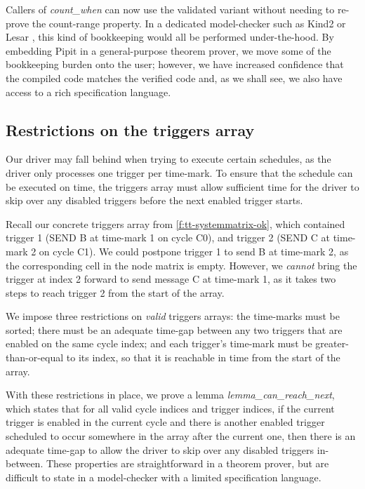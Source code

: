 \documentclass[a4paper,UKenglish,cleveref, autoref, thm-restate,anonymous]{lipics-v2021}
\begin{document}
Callers of \emph{count_when} can now use the validated variant without needing to re-prove the count-range property.
In a dedicated model-checker such as Kind2 \cite{champion2016kind2} or Lesar \cite{raymond2008synchronous}, this kind of bookkeeping would all be performed under-the-hood.
By embedding Pipit in a general-purpose theorem prover, we move some of the bookkeeping burden onto the user; however, we have increased confidence that the compiled code matches the verified code and, as we shall see, we also have access to a rich specification language.


\subsection{Restrictions on the triggers array}

Our driver may fall behind when trying to execute certain schedules, as the driver only processes one trigger per time-mark.
To ensure that the schedule can be executed on time, the triggers array must allow sufficient time for the driver to skip over any disabled triggers before the next enabled trigger starts.

Recall our concrete triggers array from \autoref{f:tt-systemmatrix-ok}, which contained trigger 1 (SEND B at time-mark 1 on cycle C0), and trigger 2 (SEND C at time-mark 2 on cycle C1).
We could postpone trigger 1 to send B at time-mark 2, as the corresponding cell in the node matrix is empty.
However, we \emph{cannot} bring the trigger at index 2 forward to send message C at time-mark 1, as it takes two steps to reach trigger 2 from the start of the array.

We impose three restrictions on \emph{valid} triggers arrays: the time-marks must be sorted; there must be an adequate time-gap between any two triggers that are enabled on the same cycle index; and each trigger's time-mark must be greater-than-or-equal to its index, so that it is reachable in time from the start of the array.

With these restrictions in place, we prove a lemma \emph{lemma_can_reach_next}, which states that for all valid cycle indices and trigger indices, if the current trigger is enabled in the current cycle and there is another enabled trigger scheduled to occur somewhere in the array after the current one, then there is an adequate time-gap to allow the driver to skip over any disabled triggers in-between.
These properties are straightforward in a theorem prover, but are difficult to state in a model-checker with a limited specification language.
\end{document}
